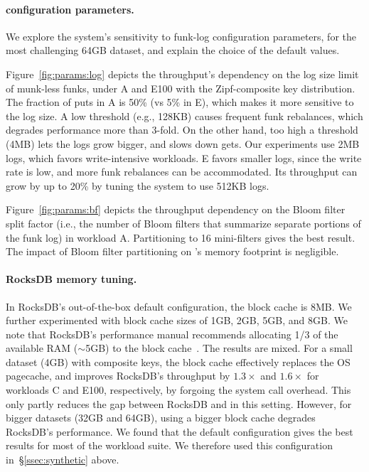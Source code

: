 \paragraph{\sys\/ configuration parameters.} 
We explore the system's  sensitivity to funk-log configuration parameters, for the most challenging 64GB dataset, 
and explain the choice of the default values.

Figure~\ref{fig:params:log} depicts the throughput's dependency on the log size limit of munk-less funks, 
under  A and E100  with the Zipf-composite key distribution. 
The fraction of puts in A is 50\% (vs 5\% in E), which makes it more sensitive to the log size. 
A low threshold (e.g., 128KB) causes frequent funk rebalances, which degrades performance more than 3-fold. 
On the other hand, too high a threshold (4MB) lets the logs grow bigger, and slows down gets. Our experiments  
use 2MB logs, which favors write-intensive workloads. E favors smaller logs, since the write 
rate is low, and more funk rebalances can be accommodated. Its throughput can  grow by up to 20\% 
by tuning the system to use 512KB logs.

Figure~\ref{fig:params:bf} depicts the throughput dependency on the Bloom filter split factor (i.e., the 
number of Bloom filters that summarize separate portions of the funk log) in workload A. 
Partitioning to 16 mini-filters gives the best result. %
The impact of Bloom filter partitioning on \sys's %
memory footprint is negligible.

\paragraph{RocksDB memory tuning.} In RocksDB's out-of-the-box default configuration, the block cache is 8MB. 
We further experimented with block cache sizes of 1GB, 2GB, 5GB, and 8GB. We note that 
RocksDB's performance manual recommends allocating 1/3 of the available RAM 
($\sim$5GB) to the block cache~\cite{RocksDBMemoryTuning}.
The results are mixed. For a small 
dataset (4GB) with composite keys, the block cache effectively replaces 
the OS pagecache, and improves RocksDB's throughput by $1.3\times$ and $1.6\times$
for workloads C and E100, respectively, by forgoing the system call overhead. This only partly reduces the gap between
RocksDB and \sys\/ in this setting. 
However, for  bigger datasets (32GB and 64GB),   using a  bigger block cache degrades  RocksDB's performance. 
We found that the default configuration gives the best results for most of the workload suite. 
We therefore used this configuration  in~\S\ref{ssec:synthetic} above.   

